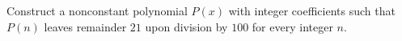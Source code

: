 Construct a nonconstant polynomial $P(x)$ with integer coefficients such that $P(n)$ leaves remainder $21$ upon division by $100$ for every integer $n$.
